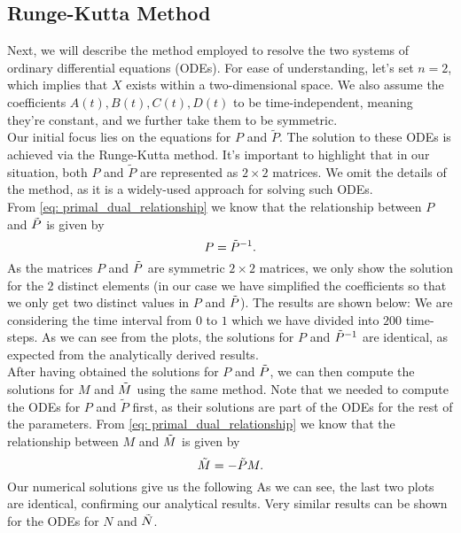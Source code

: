 \subsection{Runge-Kutta Method}
Next, we will describe the method employed to resolve the two systems of ordinary differential equations (ODEs). For ease of understanding, let's set $n=2$, which implies that $X$ exists within a two-dimensional space. We also assume the coefficients $A(t), B(t), C(t), D(t)$ to be time-independent, meaning they're constant, and we further take them to be symmetric.\\

Our initial focus lies on the equations for $P$ and $\tilde{P}$. The solution to these ODEs is achieved via the Runge-Kutta method. It's important to highlight that in our situation, both $P$ and $\tilde{P}$ are represented as $2 \times 2$ matrices. We omit the details of the method, as it is a widely-used approach for solving such ODEs.\\

From \eqref{eq: primal_dual_relationship} we know that the relationship between $P$ and $\Tilde{P}$ is given by
\begin{equation*}
    P = \Tilde{P}^{-1}.
\end{equation*}
As the matrices $P$ and $\Tilde{P}$ are symmetric $2 \times 2$ matrices, we only show the solution for the $2$ distinct elements (in our case we have simplified the coefficients so that we only get two distinct values in $P$ and $\Tilde{P}$). The results are shown below:
We are considering the time interval from $0$ to $1$ which we have divided into $200$ time-steps. As we can see from the plots, the solutions for $P$ and $\Tilde{P}^{-1}$ are identical, as expected from the analytically derived results. \\

After having obtained the solutions for $P$ and $\Tilde{P}$, we can then compute the solutions for $M$ and $\Tilde{M}$ using the same method. Note that we needed to compute the ODEs for $P$ and $\tilde{P}$ first, as their solutions are part of the ODEs for the rest of the parameters. From \eqref{eq: primal_dual_relationship} we know that the relationship between $M$ and $\Tilde{M}$ is given by
\begin{equation*}
    \Tilde{M} = -\tilde{P} M.
\end{equation*}
Our numerical solutions give us the following 
As we can see, the last two plots are identical, confirming our analytical results. Very similar results can be shown for the ODEs for $N$ and $\Tilde{N}$. \\

